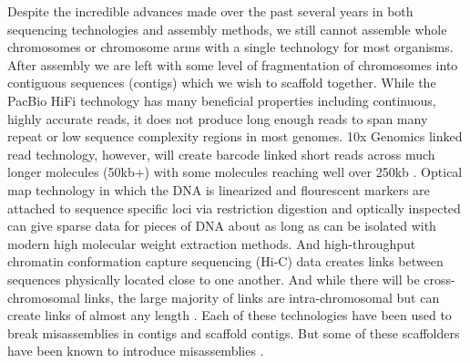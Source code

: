 \par{
Despite the incredible advances made over the past several years in both sequencing technologies and assembly methods, we still cannot assemble whole chromosomes or chromosome arms with a 
single technology for most organisms. After assembly we are left with some level of fragmentation of chromosomes into contiguous sequences (contigs) which we wish to scaffold together. While the 
PacBio HiFi technology has many beneficial properties including continuous, highly accurate reads, it does not produce long enough reads to span many repeat or low sequence complexity regions in most genomes.
 10x Genomics linked read technology, however, will create barcode linked short reads across much longer molecules (50kb+) with some molecules reaching well over 250kb \cite{10xlinked}. Optical map technology in which the DNA is linearized and flourescent markers are attached to sequence specific loci via restriction digestion and optically inspected can give sparse data for pieces of DNA about as long as can be isolated with modern high molecular weight extraction methods\cite{opticalmaps1}. And high-throughput chromatin conformation capture sequencing (Hi-C) data creates links between sequences physically located close to one another. And while there will be cross-chromosomal links, the large majority of links are intra-chromosomal but can create links of almost any length \cite{3CHIC} \cite{HIC}. Each of these technologies have been used to break misassemblies in contigs and scaffold contigs\cite{scaff10x}\cite{opticalhuman}\cite{hicscafffirst}\cite{SALSA}\cite{GRAAL}\cite{instaGRAAL}. But some of these scaffolders have been known to introduce misassemblies \cite{hicscafffirst}. 
} \\


